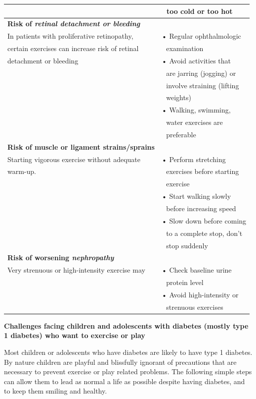 {\begin{longtable}{|l|l|}
 & \,\, too cold or too hot\\
\hline
\textbf{Risk of \textit{retinal detachment or bleeding}} & \\
In patients with proliferative retinopathy, & • Regular ophthalmologic\\
certain exercises can increase risk of retinal & \,\, examination\\
detachment or bleeding & • Avoid activities that\\
 & \,\, are jarring (jogging) or\\
 & \,\, involve straining (lifting\\
 & \,\, weights)\\
 & • Walking, swimming,\\
 & \,\, water exercises are\\
 & \,\, preferable\\
\hline
\textbf{Risk of muscle or ligament strains/sprains} & \\
Starting vigorous exercise without adequate & • Perform stretching\\
warm-up. & \,\, exercises before starting\\
 & \,\, exercise\\
 & • Start walking slowly\\
 & \,\, before increasing speed\\
 & • Slow down before coming\\
 & \,\, to a complete stop, don’t\\
 & \,\, stop suddenly\\
\hline
\textbf{Risk of worsening \textit{nephropathy}} & \\
Very strenuous or high-intensity exercise may & • Check baseline urine\\
 & \,\, protein level\\
 & • Avoid high-intensity or\\
 & \,\, strenuous exercises\\
\hline
\end{longtable}
}\relax

\noindent\textbf{Challenges facing children and adolescents with diabetes (mostly type 1 diabetes) who want to exercise or play}

Most children or adolescents who have diabetes are likely to have type 1 diabetes. By nature children are playful and blissfully ignorant of precautions that are necessary to prevent exercise or play related problems. The following simple steps can allow them to lead as normal a life as possible despite having diabetes, and to keep them smiling and healthy.

